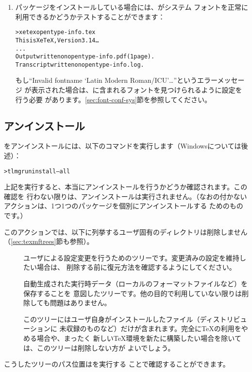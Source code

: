 \documentclass[uplatex,dvipdfmx,12pt]{jsarticle}
\begin{document}
\begin{enumerate}
\item {}パッケージをインストールしている場合には、\XeTeX がシステム
フォントを正常に利用できるかどうかテストすることができます：
%
\begin{alltt}
> xetex opentype-info.tex
This is XeTeX, Version 3.14\dots
...
Output written on opentype-info.pdf (1 page).
Transcript written on opentype-info.log.
\end{alltt}
%
もし``Invalid fontname `Latin Modern Roman/ICU'\dots''というエラーメッセージ
が表示された場合は、\TL に含まれるフォントを見つけられるように設定を行う必要
があります。\ref{sec:font-conf-sys}節を参照してください。
\end{enumerate}

\subsection{アンインストール}
\label{sec:uninstall}

\TL をアンインストールには、以下のコマンドを実行します（Windowsについては後述）：
%
\begin{alltt}
> tlmgr uninstall --all
\end{alltt}
%
上記を実行すると、本当にアンインストールを行うかどうか確認されます。この確認を
行わない限りは、アンインストールは実行されません。（なおの付かない
アクションは、1つ1つのパッケージを個別にアンインストールする
ためのものです。）

このアクションでは、以下に列挙するユーザ固有のディレクトリは削除しません
（\ref{sec:texmftrees}節も参照）。
%
\begin{description}
\item[]
ユーザによる設定変更を行うためのツリーです。変更済みの設定を維持したい場合は、
削除する前に復元方法を確認するようにしてください。

\item[]
自動生成された実行時データ（ローカルのフォーマットファイルなど）を保存することを
意図したツリーです。他の目的で利用していない限りは削除しても問題はありません。

\item[]
このツリーにはユーザ自身がインストールしたファイル（ディストリビューションに
未収録のものなど）だけが含まれます。完全に\TeX の利用をやめる場合や、まったく
新しい\TeX 環境を新たに構築したい場合を除いては、このツリーは削除しない方が
よいでしょう。
\end{description}
%
こうしたツリーのパス位置はを実行する
ことで確認することができます。
\end{document}
